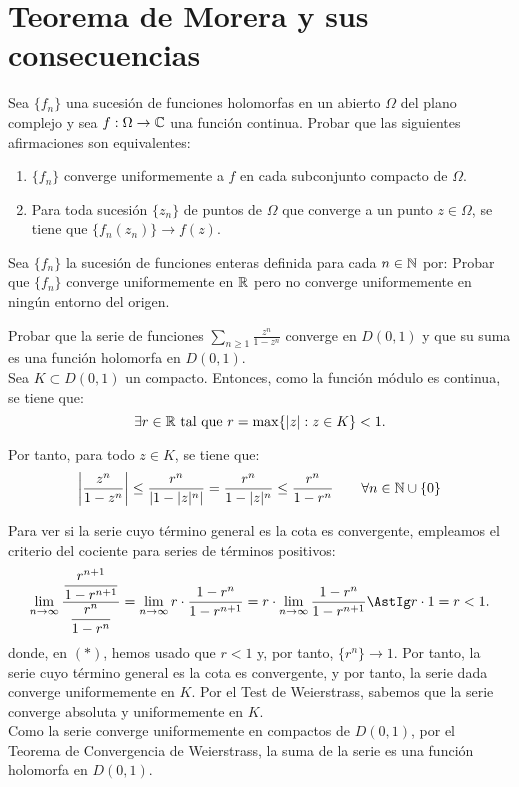 \section{Teorema de Morera y sus consecuencias}

\begin{ejercicio}
    Sea $\{f_n\}$ una sucesión de funciones holomorfas en un abierto $\Omega$ del plano complejo y sea $f:\Omega\to\mathbb{C}$ una función continua. Probar que las siguientes afirmaciones son equivalentes:
    \begin{enumerate}
        \item $\{f_n\}$ converge uniformemente a $f$ en cada subconjunto compacto de $\Omega$.
        \item Para toda sucesión $\{z_n\}$ de puntos de $\Omega$ que converge a un punto $z\in\Omega$, se tiene que $\{f_n(z_n)\}\to f(z)$.
    \end{enumerate}
\end{ejercicio}

\begin{ejercicio}
    Sea $\{f_n\}$ la sucesión de funciones enteras definida para cada $n\in\mathbb{N}$ por:
    Probar que $\{f_n\}$ converge uniformemente en $\mathbb{R}$ pero no converge uniformemente en ningún entorno del origen.
\end{ejercicio}

\begin{ejercicio}
    Probar que la serie de funciones $\sum\limits_{n\geq 1} \frac{z^n}{1-z^n}$ converge en $D(0,1)$ y que su suma es una función holomorfa en $D(0,1)$.\\

    Sea $K\subset D(0,1)$ un compacto. Entonces, como la función módulo es continua, se tiene que:
    \[
    \exists r\in \bb{R}\ \text{tal que}\ r=\max\{|z| : z\in K\}<1.
    \]

    Por tanto, para todo $z\in K$, se tiene que:
    \[
    \left|\dfrac{z^n}{1-z^n}\right| \leq \dfrac{r^n}{\left|1-|z|^n\right|} = \dfrac{r^n}{1-|z|^n} \leq \dfrac{r^n}{1-r^n}\qquad \forall n\in \mathbb{N}\cup \{0\}
    \]

    Para ver si la serie cuyo término general es la cota es convergente, empleamos el criterio del cociente para series de términos positivos:
    \begin{equation*}
        \lim_{n\to\infty} \dfrac{\dfrac{r^{n+1}}{1-r^{n+1}}}{\dfrac{r^n}{1-r^n}}
        = \lim_{n\to\infty} r \cdot \dfrac{1-r^n}{1-r^{n+1}} = r\cdot \lim_{n\to\infty} \dfrac{1-r^n}{1-r^{n+1}} \AstIg r\cdot 1 = r < 1.
    \end{equation*}
    donde, en $(\ast)$, hemos usado que $r<1$ y, por tanto, $\{r^n\}\to 1$. Por tanto, la serie cuyo término general es la cota es convergente, y por tanto, la serie dada converge uniformemente en $K$. Por el Test de Weierstrass, sabemos que la serie converge absoluta y uniformemente en $K$.\\

    Como la serie converge uniformemente en compactos de $D(0,1)$, por el Teorema de Convergencia de Weierstrass, la suma de la serie es una función holomorfa en $D(0,1)$. 
\end{ejercicio}

